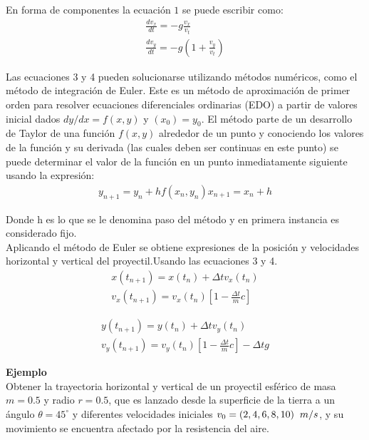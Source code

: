 \documentclass[12pt,a4paper,twoside]{article}
\begin{document}
En forma de componentes la ecuación $1$ se puede escribir como:
\begin{eqnarray}
\frac{dv_{x}}{dt} = -g\frac{v_{x}}{v_{t}} \\
\frac{dv_{y}}{dt} = -g (1+\frac{v_{y}}{v_{t}})
\end{eqnarray}

Las ecuaciones 3 y 4 pueden solucionarse utilizando métodos numéricos, como el método de integración de  Euler. Este es un método de  aproximación de primer orden para resolver ecuaciones diferenciales ordinarias (EDO) a partir de  valores inicial dados $ dy/dx = f(x,y)$ y  $(x_{0})= y_{0}$. El método parte de un desarrollo de Taylor de una función $f(x,y)$ alrededor de un punto y   conociendo los valores de la función y su derivada (las cuales deben ser continuas en este punto) se puede determinar el valor de la función en un punto inmediatamente siguiente usando la expresión: \\
\begin{eqnarray}
y_{n+1}= y_{n} + hf(x_{n},y_{n})
x_{n+1}= x_{n} + h
\end{eqnarray}

Donde h es lo que se le denomina paso del método y en primera instancia es considerado fijo.\\

Aplicando el método de Euler se obtiene  expresiones de la posición y velocidades horizontal y vertical del proyectil.Usando las ecuaciones 3 y 4. \\

\begin{eqnarray}
x(t_{n+1})= x(t_{n})+\Delta t v_{x}(t_{n})\\
v_{x}(t_{n+1}) = v_{x}(t_{n})[1-\frac{\Delta t}{m} c]
\end{eqnarray}
 
\begin{eqnarray}
y(t_{n+1})= y(t_{n})+\Delta t v_{y}(t_{n})\\
v_{y}(t_{n+1}) = v_{y}(t_{n})[1-\frac{\Delta t}{m} c] 
- \Delta t g
\end{eqnarray} \vspace{1cm}

\textbf{Ejemplo}\\
Obtener la trayectoria horizontal y vertical de un proyectil esférico de masa $m=0.5$ y radio $r=0.5$, que es lanzado desde la superficie de la tierra a un ángulo $\theta = 45^{\circ}$ y diferentes velocidades iniciales $v_{0} = (2,4,6,8,10)\hspace{0.2 cm} m/s$, y su movimiento se encuentra afectado por la resistencia del aire.\\
 
\end{document}
